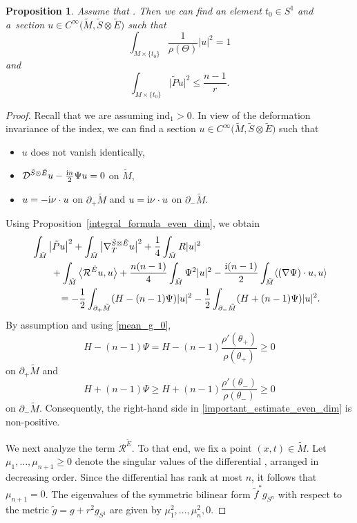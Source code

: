 \documentclass[11pt]{article}
\numberwithin{equation}{section}
\numberwithin{equation}{section}
\newtheorem{Proposition}[Theorem]{Proposition}
 { \theoremstyle{definition}
\newtheorem{Definition}[Theorem]{Definition}
\newtheorem{Note}[Theorem]{Note}
\newtheorem{Example}[Theorem]{Example}
\newtheorem{Remark}[Theorem]{Remark} }
\begin{document}
\begin{Proposition}
\label{existence_of_spinor_even_dim}
Assume that . Then we can find an element $t_0 \in S^1$ and a~section $u \in C^\infty\big(\tilde{M},\tilde{S} \otimes \tilde{E}\big)$ such that
\[\int_{M \times \{t_0\}} \frac{1}{\rho(\Theta)} |u|^2 = 1\]
and
\[\int_{M \times \{t_0\}} \big|\tilde{P} u\big|^2 \leq \frac{n-1}{r}.\]
\end{Proposition}

\begin{proof}
Recall that we are assuming $\mathrm{ind}_1 > 0$. In view of the deformation invariance of the index, we can find a section $u \in C^\infty\big(\tilde{M},\tilde{S} \otimes \tilde{E}\big)$ such that
\begin{itemize}\itemsep=0pt
 \item $u$ does not vanish identically,
 \item $\mathcal{D}^{\tilde{S} \otimes \tilde{E}} u - \frac{{\rm i}n}{2} \Psi u = 0$ on $\tilde{M}$,
 \item $u = -{\rm i} \nu \cdot u$ on $\partial_+ \tilde{M}$ and $u = {\rm i} \nu \cdot u$ on $\partial_- \tilde{M}$.
\end{itemize}
Using Proposition~\ref{integral_formula_even_dim}, we obtain
\begin{align}
&\int_{\tilde{M}} \big|\tilde{P} u\big|^2 + \int_{\tilde{M}} \big|\nabla_T^{\tilde{S} \otimes \tilde{E}} u\big|^2 + \frac{1}{4} \int_{\tilde{M}} R |u|^2\nonumber \\
&\qquad{}+ \int_{\tilde{M}} \big\langle \mathcal{R}^{\tilde{E}} u,u \big\rangle + \frac{n(n-1)}{4} \int_{\tilde{M}} \Psi^2 |u|^2 - \frac{{\rm i}(n-1)}{2} \int_{\tilde{M}} \langle (\nabla \Psi) \cdot u,u \rangle \nonumber\\
&\phantom{\qquad+}{}= -\frac{1}{2} \int_{\partial_+ \tilde{M}} (H-(n-1)\Psi) |u|^2 - \frac{1}{2} \int_{\partial_- \tilde{M}} (H+(n-1)\Psi) |u|^2.\label{important_estimate_even_dim}
\end{align}
By assumption and using \eqref{mean_g_0}, \[H-(n-1)\Psi = H-(n-1) \frac{\rho'(\theta_+)}{\rho(\theta_+)} \geq 0\] on $\partial_+ \tilde{M}$ and \[H +(n-1)\Psi \geq H+(n-1) \frac{\rho'(\theta_-)}{\rho(\theta_-)} \geq 0\] on $\partial_- \tilde{M}$. Consequently, the right-hand side in \eqref{important_estimate_even_dim} is non-positive.

We next analyze the term $\mathcal{R}^{\tilde{E}}$. To that end, we fix a point $(x,t) \in \tilde{M}$. Let $ \mu_1,\hdots,\mu_{n+1} \geq 0$ denote the singular values of the differential , arranged in decreasing order. Since the differential  has rank at most $n$, it follows that $\mu_{n+1} = 0$.
The eigenvalues of the symmetric bilinear form $\tilde{f}^* g_{S^n}$ with respect to the metric $\tilde{g} = g + r^2 g_{S^1}$ are given by $\mu_1^2,\hdots,\mu_n^2,0$.


\end{proof}
\end{document}
